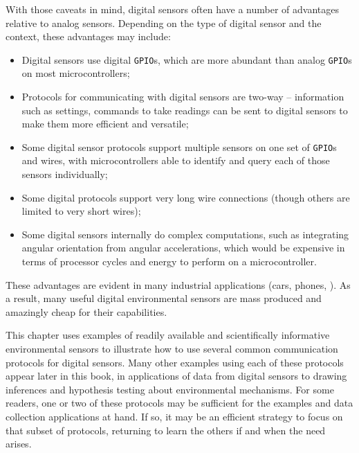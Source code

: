 With those caveats in mind, digital sensors often have a number of advantages relative to analog sensors.
Depending on the type of digital sensor and the context, these advantages may include:
\begin{itemize}
	\item Digital sensors use digital \texttt{GPIO}s, which are more abundant than analog \texttt{GPIO}s on most microcontrollers;
	\item Protocols for communicating with digital sensors are two-way -- information such as settings, commands to take readings \etc can be sent to digital sensors to make them more efficient and versatile;
	\item Some digital sensor protocols support multiple sensors on one set of \texttt{GPIO}s and wires, with microcontrollers able to identify and query each of those sensors individually;
	\item Some digital protocols support very long wire connections (though others are limited to very short wires);
	\item Some digital sensors internally do complex computations, such as integrating angular orientation from angular accelerations, which would be expensive in terms of processor cycles and energy to perform on a microcontroller.
\end{itemize}
These advantages are evident in many industrial applications (cars, phones, \etc).
As a result, many useful digital environmental sensors are mass produced and amazingly cheap for their capabilities.

This chapter uses examples of readily available and scientifically informative environmental sensors to illustrate how to use several common communication protocols for digital sensors.
Many other examples using each of these protocols appear later in this book, in applications of data from digital sensors to drawing inferences and hypothesis testing about environmental mechanisms.
For some readers, one or two of these protocols may be sufficient for the examples and data collection applications at hand.
If so, it may be an efficient strategy to focus on that subset of protocols, returning to learn the others if and when the need arises.

